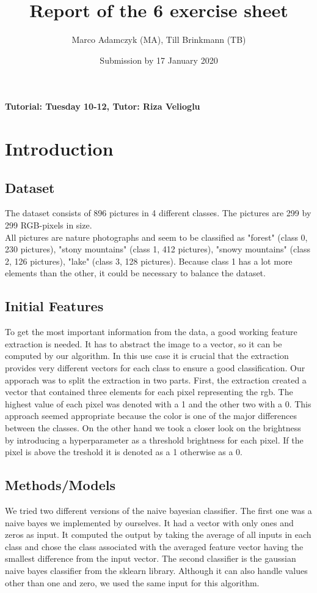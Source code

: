 \documentclass[a4paper,12pt]{article}
\title{Report of the 6\ts{th} exercise sheet}
\author{Marco Adamczyk (MA), Till Brinkmann (TB)}
\date{Submission by 17\ts{th} January 2020}
\newcommand{\initials}[1]{\marginpar{\quad\texttt{#1}}}
\begin{document}
	
	
	\pagestyle{myheadings}
	
	\maketitle
	
	\begin{center}
		\textbf{Tutorial: Tuesday 10-12, Tutor: Riza Velioglu}
	\end{center}
	
	\section{Introduction}
	\subsection{Dataset}
	The dataset consists of 896 pictures in 4 different classes. The pictures are 299 by 299 RGB-pixels in size.\\
	All pictures are nature photographs and seem to be classified as 
	"forest" (class 0, 230 pictures), "stony mountains" (class 1, 412 pictures), "snowy mountains" (class 2, 126 pictures), "lake" (class 3, 128 pictures).
	Because class 1 has a lot more elements than the other, it could be necessary to balance the dataset. 
	\initials{TB}
	\subsection{Initial Features}
	To get the most important information from the data, a good working feature extraction is needed. It has to abstract the image to a vector, so it can be computed by our algorithm. 
	In this use case it is crucial that the extraction provides very different vectors for each class to ensure a good classification.
	Our apporach was to split the extraction in two parts. First, the extraction created a vector that contained three elements for each pixel representing the rgb. The highest value of each pixel was denoted with a 1 and the other two with a 0. This approach seemed appropriate because the color is one of the major differences between the classes.
	On the other hand we took a closer look on the brightness by introducing a hyperparameter as a threshold brightness for each pixel. If the pixel is above the treshold it is denoted as a 1 otherwise as a 0.
	\initials{MA}
	\subsection{Methods/Models}
	We tried two different versions of the naive bayesian classifier. The first one was a naive bayes we implemented by ourselves. It had a vector with only ones and zeros as input. It computed the output by taking the average of all inputs in each class and chose 
	the class associated with the averaged feature vector having the smallest difference from the input vector.
	The second classifier is the gaussian naive bayes classifier from the sklearn library. Although it can also handle values other than one and zero, we used the same input for this algorithm.
	\initials{MA}
	
\end{document}

